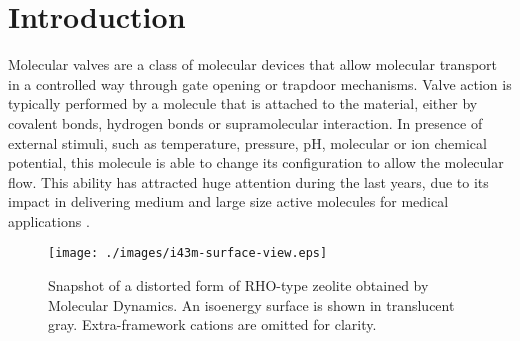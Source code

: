 \section{Introduction}
Molecular valves are a class of molecular devices that allow molecular transport in a controlled way through gate opening or trapdoor mechanisms. Valve action is typically performed by a molecule that is attached to the material, either by covalent bonds, hydrogen bonds or supramolecular interaction. In presence of external stimuli, such as temperature, pressure, pH, molecular or ion chemical potential, this molecule is able to change its configuration to allow the molecular flow. This ability has attracted huge attention during the last years, due to its impact in delivering medium and large size active molecules for medical applications \cite{mengvalve2010,C1MD00158B,doi:10.1021/nn3018365,doi:10.1021/nn101499d}.
\begin{figure}[!htpb]
  \centering
  \texttt{[image: ./images/i43m-surface-view.eps]}
  \caption{\label{fig:i43m}Snapshot of a distorted form of RHO-type zeolite obtained by Molecular Dynamics. An isoenergy surface is shown in translucent gray. Extra-framework cations are omitted for clarity.
  }
\end{figure}

\lipsum[1-12]
